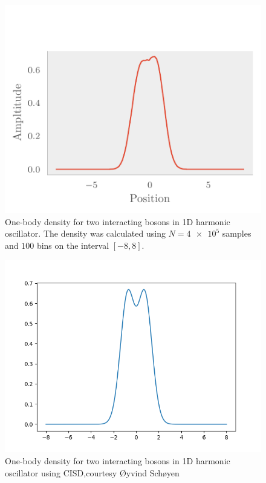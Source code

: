 \begin{figure}[H]
	\includegraphics[]{figures/many_part_int_onebody.pdf}
	\caption{One-body density for two interacting bosons in 1D harmonic
      oscillator. The density was calculated using $N=\num{4e5}$ samples and $100$
      bins on the interval $[-8,8]$.} 
	\label{fig:many_part_int_onebody}
\end{figure}

\begin{figure}[H]
	\includegraphics[scale = 0.4]{figures/oyvind.png}
	\caption{One-body density for two interacting bosons in 1D harmonic oscillator using CISD,courtesy Øyvind Schøyen}
	\label{fig:onebody_oyvind}
\end{figure}

